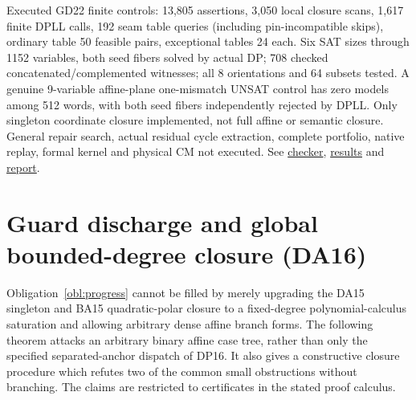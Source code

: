 \documentclass[11pt]{article}
\begin{document}
Executed GD22 finite controls: 13,805 assertions, 3,050 local closure scans, 1,617 finite DPLL calls, 192 seam table queries (including pin-incompatible skips), ordinary table 50 feasible pairs, exceptional tables 24 each. Six SAT sizes through 1152 variables, both seed fibers solved by actual DP; 708 checked concatenated/complemented witnesses; all 8 orientations and 64 subsets tested. A genuine 9-variable affine-plane one-mismatch UNSAT control has zero models among 512 words, with both seed fibers independently rejected by DPLL. Only singleton coordinate closure implemented, not full affine or semantic closure. General repair search, actual residual cycle extraction, complete portfolio, native replay, formal kernel and physical CM not executed. See \href{https://github.com/j15marti/pnp/commit/e028a71af63e85addc063db51f0ab934367a1bb2}{checker}, \href{https://github.com/j15marti/pnp/commit/3ee57e0eb6c901a8f565d9c800e202f67611592e}{results} and \href{https://github.com/j15marti/pnp/commit/1ebb1494d28732b6657a3990c262ca3e899c8d1f}{report}.


\section{Guard discharge and global bounded-degree closure (DA16)}\label{sec:da16}
Obligation~\ref{obl:progress} cannot be filled by merely upgrading the DA15 singleton and BA15 quadratic-polar closure to a fixed-degree polynomial-calculus saturation and allowing arbitrary dense affine branch forms. The following theorem attacks an arbitrary binary affine case tree, rather than only the specified separated-anchor dispatch of DP16. It also gives a constructive closure procedure which refutes two of the common small obstructions without branching. The claims are restricted to certificates in the stated proof calculus.
\end{document}
